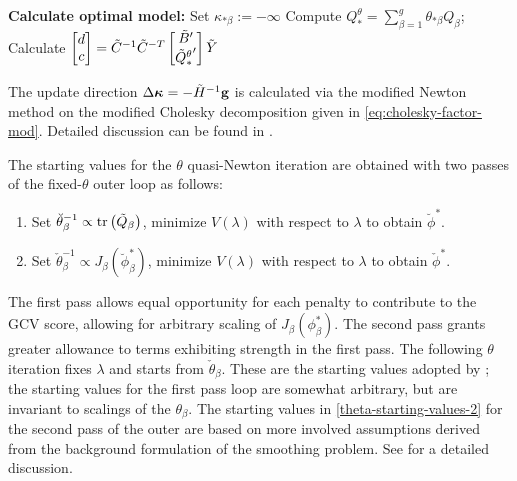 \begin{algorithm}[H]
\begin{algorithmic}
			\ENDIF
	\ENDWHILE
\STATE \textbf{Calculate optimal model:} 
		\STATE Set $\kappa_{*\beta} := -\infty$
	\ENDIF
	\STATE Compute $Q_*^\theta = \sum_{\beta = 1}^g \theta_{*\beta} Q_\beta$;
	\STATE Calculate $\begin{bmatrix} d \\ c \end{bmatrix} = \tilde{C}^{-1} \tilde{C}^{-T} \begin{bmatrix} \tilde{B}' \\ {\tilde{Q}_*^\theta}' \end{bmatrix} \tilde{Y}$
					
\end{algorithmic}
\end{algorithm}

The update direction $\Delta \mbox{\boldmath $\kappa$} = -\tilde{H}^{-1} \mathbf{g}$ is calculated via the modified Newton method on the modified Cholesky decomposition given in \ref{eq:cholesky-factor-mod}. Detailed discussion can be found in \citet{gill1981practical}.
\bigskip

The starting values for the $\theta$ quasi-Newton iteration are obtained with two passes of the fixed-$\theta$ outer loop as follows:

\begin{enumerate}
\item Set $\breve{\theta}_\beta^{-1} \propto \mbox{tr}\left( \tilde{Q}_\beta \right)$, minimize $V\left(\lambda\right)$ with respect to $\lambda$ to obtain $\breve{\phi}^*$. \label{theta-starting-values-1}
\item Set $\check{\theta}_\beta^{-1} \propto  J_\beta\left(\breve{\phi}^*_\beta \right)$, minimize $V\left(\lambda\right)$ with respect to $\lambda$ to obtain $\check{\phi}^*$. \label{theta-starting-values-2}
\end{enumerate}
\noindent
The first pass allows equal opportunity for each penalty to contribute to the GCV score, allowing for arbitrary scaling of $J_\beta \left(\phi^*_\beta\right)$. The second pass grants greater allowance to terms exhibiting strength in the first pass. The following $\theta$ iteration fixes $\lambda$ and starts from $\check{\theta}_\beta$. These are the starting values adopted by \citet{gu1991minimizing}; the starting values for the first pass loop are somewhat arbitrary, but are invariant to scalings of the $\theta_\beta$. The starting values in \ref{theta-starting-values-2} for the second pass of the outer are based on more involved assumptions derived from the background formulation of the smoothing problem. See \citet{gu1991minimizing} for a detailed discussion.

